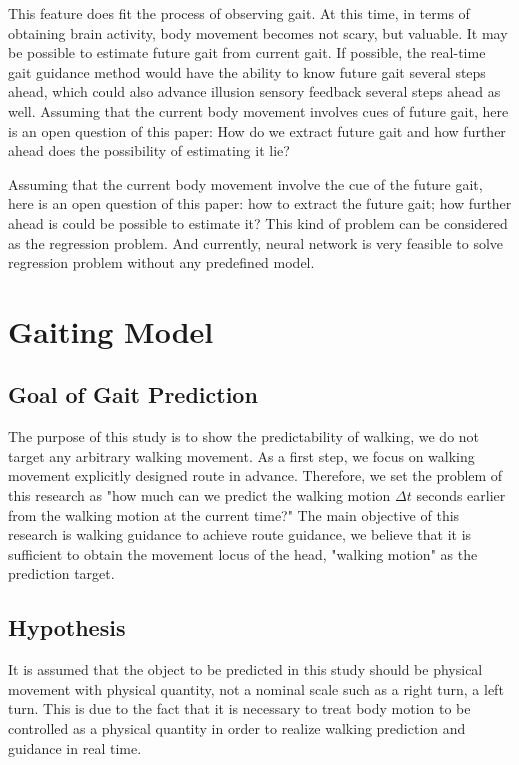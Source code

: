 \documentclass{sigchi}
\begin{document}
 This feature does fit the process of observing gait. At this time, in terms of obtaining brain activity, body movement becomes not scary, but valuable. It may be possible to estimate future gait from current gait. If possible, the real-time gait guidance method would have the ability to know future gait several steps ahead, which could also advance illusion sensory feedback several steps ahead as well. 
Assuming that the current body movement involves cues of future gait, here is an open question of this paper: How do we extract future gait and how further ahead does the possibility of estimating it lie?

Assuming that the current body movement involve the cue of the future gait, here is an open question of this paper: how to extract the future gait; how further ahead is could be possible to estimate it? This kind of problem can be considered as the regression problem. And currently, neural network\cite{LIU1999391} is very feasible to solve regression problem without any predefined model.


\section{Gaiting Model}

\subsection{Goal of Gait Prediction}
The purpose of this study is to show the predictability of walking, we do not target any arbitrary walking movement. As a first step, we focus on walking movement explicitly designed route in advance. Therefore, we set the problem of this research as "how much can we predict the walking motion $\Delta t$ seconds earlier from the walking motion at the current time?" The main objective of this research is walking guidance to achieve route guidance, we believe that it is sufficient to obtain the movement locus of the head, "walking motion" as the prediction target.

\subsection{Hypothesis}
It is assumed that the object to be predicted in this study should be physical movement with physical quantity, not a nominal scale such as a right turn, a left turn. This is due to the fact that it is necessary to treat body motion to be controlled as a physical quantity in order to realize walking prediction and guidance in real time. 
\end{document}
